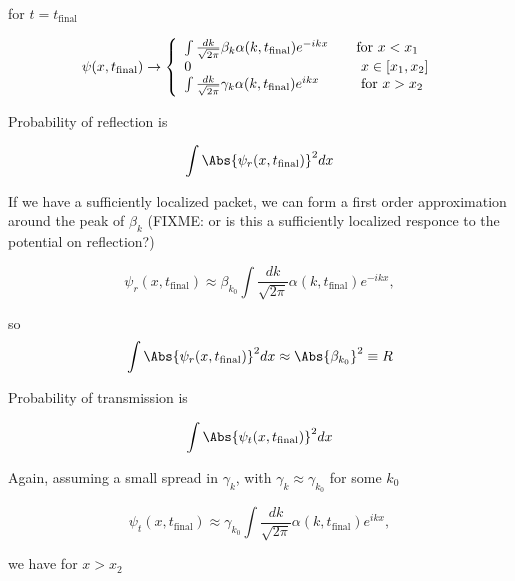 for $t = t_{\text{final}}$

\begin{equation}\label{eqn:qmTwoL22:370}
\psi(x, t_{\text{final}}) 
\rightarrow 
\left\{
\begin{array}{l l}
\int \frac{dk}{\sqrt{2 \pi}} \beta_k \alpha(k, t_{\text{final}}) e^{-i k x} &\quad \mbox{for $x < x_1$} \\
0 & \quad \mbox{ $x \in [x_1, x_2]$} \\
\int \frac{dk}{\sqrt{2 \pi}} \gamma_k \alpha(k, t_{\text{final}}) e^{i k x} 
 & \quad \mbox{ for $x > x_2$ }
\end{array}
\right.
\end{equation}

Probability of reflection is 

\begin{equation}\label{eqn:qmTwoL22:390}
\int \Abs{\psi_r(x, t_{\text{final}})}^2 dx
\end{equation}

If we have a sufficiently localized packet, we can form a first order approximation around the peak of $\beta_k$ (FIXME: or is this a sufficiently localized responce to the potential on reflection?)

\begin{equation}\label{eqn:qmTwoL22:410}
\psi_r(x, t_{\text{final}}) \approx \beta_{k_0} 
\int \frac{dk}{\sqrt{2 \pi}} \alpha(k, t_{\text{final}}) e^{-i k x},
\end{equation}

so
\begin{equation}\label{eqn:qmTwoL22:430}
\int \Abs{\psi_r(x, t_{\text{final}})}^2 dx
\approx \Abs{\beta_{k_0}}^2 \equiv R
\end{equation}

Probability of transmission is 

\begin{equation}\label{eqn:qmTwoL22:450}
\int \Abs{\psi_t(x, t_{\text{final}})}^2 dx
\end{equation}

Again, assuming a small spread in $\gamma_k$, with $\gamma_k \approx \gamma_{k_0}$ for some $k_0$

\begin{equation}\label{eqn:qmTwoL22:470}
\psi_t(x, t_{\text{final}}) \approx \gamma_{k_0} 
\int \frac{dk}{\sqrt{2 \pi}} \alpha(k, t_{\text{final}}) e^{i k x},
\end{equation}

we have for $x > x_2$

